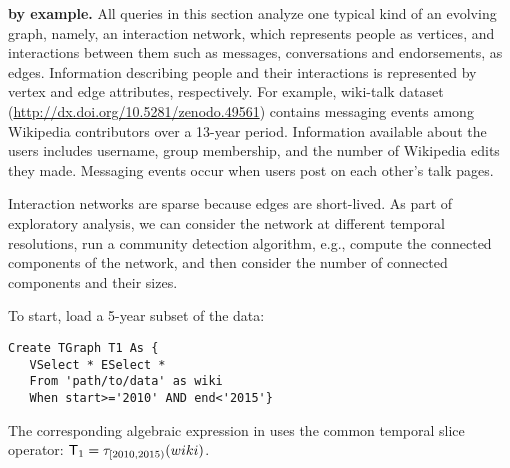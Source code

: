 {\bf \ql by example.}  All queries in this section analyze one typical
kind of an evolving graph, namely, an interaction network, which
represents people as vertices, and interactions between them such as
messages, conversations and endorsements, as edges.  Information
describing people and their interactions is represented by vertex and
edge attributes, respectively. For example, wiki-talk dataset
(\url{http://dx.doi.org/10.5281/zenodo.49561}) contains messaging
events among Wikipedia contributors over a 13-year period.
Information available about the users includes username, group
membership, and the number of Wikipedia edits they made.  Messaging
events occur when users post on each other's talk pages.

Interaction networks are sparse because edges are short-lived.  As
part of exploratory analysis, we can consider the network at different
temporal resolutions, run a community detection algorithm, e.g.,
compute the connected components of the network, and then consider the
number of connected components and their sizes.  




\begin{example}
\label{ex:slice}
To start, load a 5-year subset of the data:
\begin{small}
\begin{verbatim}
Create TGraph T1 As {
   VSelect * ESelect *  
   From 'path/to/data' as wiki
   When start>='2010' AND end<'2015'}
\end{verbatim}
\end{small}

The corresponding algebraic expression in \tga uses the common
temporal slice operator: $\mathsf{T}_1 = \tau_{[2010, 2015)}(wiki)$.

\end{example}

